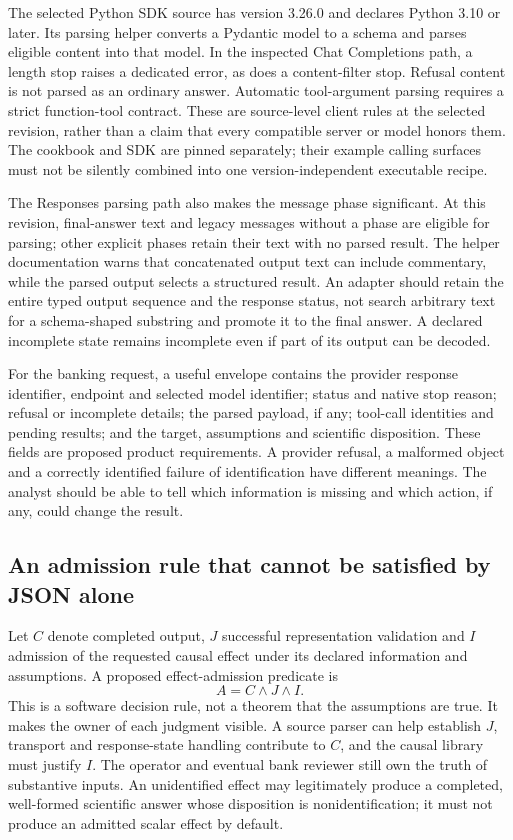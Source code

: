 The selected Python SDK source has version 3.26.0 and declares Python 3.10 or later. Its parsing helper converts
a Pydantic model to a schema and parses eligible content into that model. In the inspected Chat Completions path,
a length stop raises a dedicated error, as does a content-filter stop. Refusal content is not parsed as an ordinary
answer. Automatic tool-argument parsing requires a strict function-tool contract. These are source-level client
rules at the selected revision, rather than a claim that every compatible server or model honors them.
The cookbook and SDK are pinned separately; their example calling surfaces must not be silently combined into
one version-independent executable recipe.~\citep{exec28_oa_sdk,exec28_oa_cookbook}

The Responses parsing path also makes the message phase significant. At this revision, final-answer text and
legacy messages without a phase are eligible for parsing; other explicit phases retain their text with no parsed
result. The helper documentation warns that concatenated output text can include commentary, while the parsed
output selects a structured result. An adapter should retain the entire typed output sequence and the response
status, not search arbitrary text for a schema-shaped substring and promote it to the final answer. A declared
incomplete state remains incomplete even if part of its output can be decoded.~\citep{exec28_oa_sdk}

For the banking request, a useful envelope contains the provider response identifier, endpoint and selected
model identifier; status and native stop reason; refusal or incomplete details; the parsed payload, if any;
tool-call identities and pending results; and the target, assumptions and scientific disposition. These fields
are proposed product requirements. A provider refusal, a malformed object and a correctly identified failure
of identification have different meanings. The analyst should be able to tell which information is missing
and which action, if any, could change the result.

\subsection{An admission rule that cannot be satisfied by JSON alone}
Let \(C\) denote completed output, \(J\) successful representation validation and \(I\) admission of the
requested causal effect under its declared information and assumptions. A proposed effect-admission predicate is
\[
 A=C\land J\land I.
\]
This is a software decision rule, not a theorem that the assumptions are true. It makes the owner of each
judgment visible. A source parser can help establish \(J\), transport and response-state handling contribute to
\(C\), and the causal library must justify \(I\). The operator and eventual bank reviewer still own the truth
of substantive inputs. An unidentified effect may legitimately produce a completed, well-formed scientific
answer whose disposition is nonidentification; it must not produce an admitted scalar effect by default.

